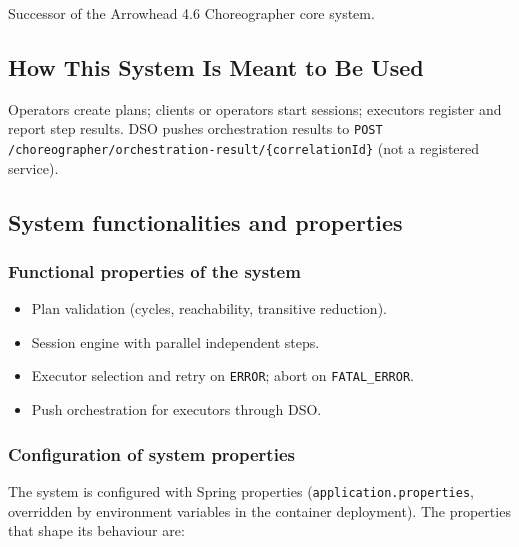\documentclass[a4paper]{arrowhead}
\begin{document}
Successor of the Arrowhead 4.6 Choreographer core system.

\subsection{How This System Is Meant to Be Used}
\label{sec:use}

Operators create plans; clients or operators start sessions; executors register and report step results. DSO pushes orchestration results to \texttt{POST /\allowbreak{}choreographer/\allowbreak{}orchestration-\allowbreak{}result/\allowbreak{}\{correlation\allowbreak{}Id\}} (not a registered service).

\subsection{System functionalities and properties}
\label{sec:properties}

\subsubsection{Functional properties of the system}

\begin{itemize}
  \item Plan validation (cycles, reachability, transitive reduction).
  \item Session engine with parallel independent steps.
  \item Executor selection and retry on \texttt{ERROR}; abort on \texttt{FATAL\_\allowbreak{}ERROR}.
  \item Push orchestration for executors through DSO.
\end{itemize}

\subsubsection{Configuration of system properties}

The system is configured with Spring properties (\texttt{application.properties}, overridden by environment variables in the container deployment). The properties that shape its behaviour are:
\end{document}
